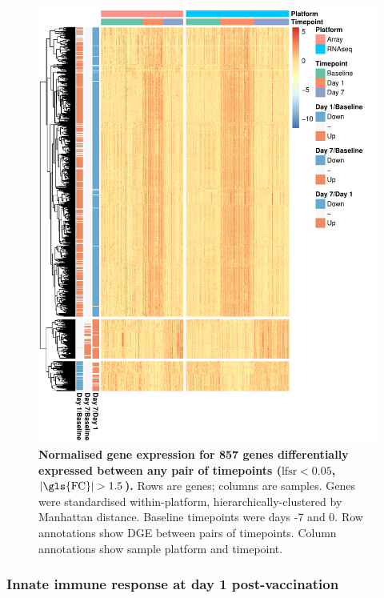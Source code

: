 \begin{figure}
    \includegraphics[width=1.0\textwidth]{mainmatter/figures/chapter_02/plot_dge_eqtl.heatmap_dge.pdf}
    \caption{
        \textbf{Normalised gene expression for 857 genes differentially expressed between any pair of timepoints ($\text{lfsr} < 0.05$, $\lvert\text{\gls{FC}}\rvert > 1.5$).}
        Rows are genes; columns are samples.
        Genes were standardised within-platform, hierarchically-clustered by Manhattan distance.
        Baseline timepoints were days -7 and 0.
        Row annotations show \gls{DGE} between pairs of timepoints.
        Column annotations show sample platform and timepoint.
    }
    \label{fig:hird_dge_heatmap}
\end{figure}

\subsubsection{Innate immune response at day 1 post-vaccination}

